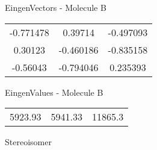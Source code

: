 \begin{multicols}{2}
\begin{center}
\vtab
 EingenVectors - Molecule B     \\
\vtab
\begin{tabular}{|c c c|}
-0.771478	 & 	0.39714	 & 	-0.497093	 \\
0.30123	 & 	-0.460186	 & 	-0.835158	 \\
-0.56043	 & 	-0.794046	 & 	0.235393
\end{tabular}

\vtab
 EingenValues - Molecule B     \\
\vtab
\begin{tabular}{|c c c|}
5923.93	 & 	5941.33	 & 	11865.3	 \\
\end{tabular}

\end{center}
\end{multicols}
\begin{center}
\vtab
\vtab
\textcolor{NavyBlue}{\Large Stereoisomer}
\end{center}

 \newpage

